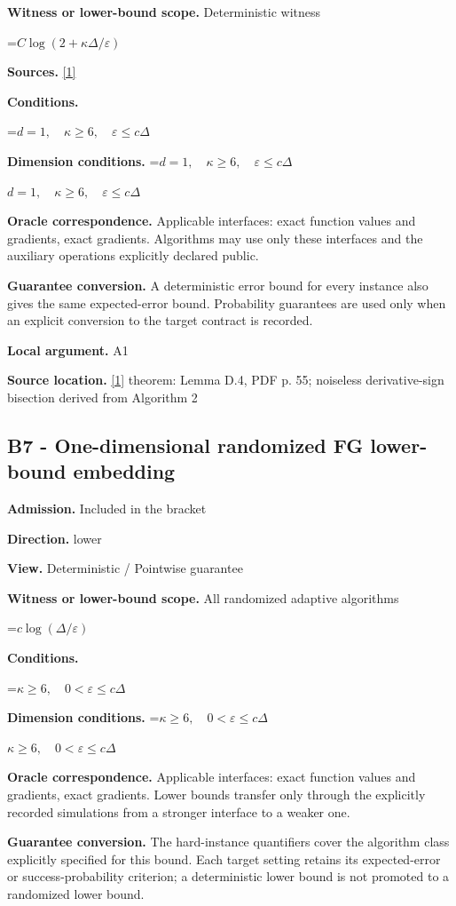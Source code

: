 \documentclass[10pt,a4paper]{article}
\newcommand{\AtlasMath}[1]{\par\begingroup\centering\setbox0=\hbox{$\displaystyle #1$}\ifdim\wd0>1.4\linewidth\typeout{ATLAS WIDE FORMULA: \the\wd0}\fi\ifdim\wd0>\linewidth\resizebox{\linewidth}{!}{\box0}\else\box0\fi\par\endgroup}
\newcommand{\AtlasInlineMath}[1]{\begingroup\setbox0=\hbox{$#1$}\ifdim\wd0>.4\linewidth\endgroup\AtlasMath{#1}\else\endgroup$#1$\fi}
\begin{document}
\textbf{Witness or lower-bound scope.} Deterministic witness

\AtlasMath{C\log(2+\kappa\Delta/\varepsilon)}
\textbf{Sources.} \href{https://arxiv.org/pdf/2609.03990}{[1]}

\textbf{Conditions.} 
\AtlasMath{d=1,\quad\kappa\ge6,\quad\varepsilon\le c\Delta}


\textbf{Dimension conditions.} \AtlasInlineMath{d=1,\quad\kappa\ge6,\quad\varepsilon\le c\Delta}

\textbf{Oracle correspondence.} Applicable interfaces: exact function values and gradients, exact gradients. Algorithms may use only these interfaces and the auxiliary operations explicitly declared public.

\textbf{Guarantee conversion.} A deterministic error bound for every instance also gives the same expected-error bound. Probability guarantees are used only when an explicit conversion to the target contract is recorded.

\textbf{Local argument.} A1

\textbf{Source location.} \href{https://arxiv.org/pdf/2609.03990}{[1]} theorem: Lemma D.4, PDF p. 55; noiseless derivative-sign bisection derived from Algorithm 2

\subsection{B7 - One-dimensional randomized FG lower-bound embedding}
\textbf{Admission.} Included in the bracket

\textbf{Direction.} lower

\textbf{View.} Deterministic / Pointwise guarantee

\textbf{Witness or lower-bound scope.} All randomized adaptive algorithms

\AtlasMath{c\log(\Delta/\varepsilon)}
\textbf{Conditions.} 
\AtlasMath{\kappa\ge6,\quad0<\varepsilon\le c\Delta}


\textbf{Dimension conditions.} \AtlasInlineMath{\kappa\ge6,\quad0<\varepsilon\le c\Delta}

\textbf{Oracle correspondence.} Applicable interfaces: exact function values and gradients, exact gradients. Lower bounds transfer only through the explicitly recorded simulations from a stronger interface to a weaker one.

\textbf{Guarantee conversion.} The hard-instance quantifiers cover the algorithm class explicitly specified for this bound. Each target setting retains its expected-error or success-probability criterion; a deterministic lower bound is not promoted to a randomized lower bound.
\end{document}
